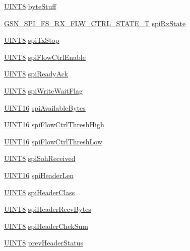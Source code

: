 \begin{DoxyCompactItemize}
\item 
\hyperlink{a00660_gab27e9918b538ce9d8ca692479b375b6a}{UINT8} \hyperlink{a00232_a7607005ffbebdca79ab3c4d558d0e442}{byteStuff}
\item 
\hyperlink{a00589_a3798d6bdf090c54eb4ca194e03183f1a}{GSN\_\-SPI\_\-FS\_\-RX\_\-FLW\_\-CTRL\_\-STATE\_\-T} \hyperlink{a00232_adf3468dddde12d5649c0b3225e1b0eb0}{spiRxState}
\item 
\hyperlink{a00660_gab27e9918b538ce9d8ca692479b375b6a}{UINT8} \hyperlink{a00232_aace49dfcb18e1db5bc4739a89ecc1ba3}{spiTxStop}
\item 
\hyperlink{a00660_gab27e9918b538ce9d8ca692479b375b6a}{UINT8} \hyperlink{a00232_a1bc4a98bab8dbbd5b534535948c82885}{spiFlowCtrlEnable}
\item 
\hyperlink{a00660_gab27e9918b538ce9d8ca692479b375b6a}{UINT8} \hyperlink{a00232_a7d64b559bc60710f2a2399d32349f735}{spiReadyAck}
\item 
\hyperlink{a00660_gab27e9918b538ce9d8ca692479b375b6a}{UINT8} \hyperlink{a00232_aece15d1c03fade6b2bb0c58ae4d868c1}{spiWriteWaitFlag}
\item 
\hyperlink{a00660_ga09f1a1fb2293e33483cc8d44aefb1eb1}{UINT16} \hyperlink{a00232_aeb856d40bd458a2626a852d943ac6011}{spiAvailableBytes}
\item 
\hyperlink{a00660_ga09f1a1fb2293e33483cc8d44aefb1eb1}{UINT16} \hyperlink{a00232_a7a439375ec71a8ebe796fcf8730e7b25}{spiFlowCtrlThreshHigh}
\item 
\hyperlink{a00660_ga09f1a1fb2293e33483cc8d44aefb1eb1}{UINT16} \hyperlink{a00232_ab3786a410bf7727e7b2a8fc665b8166e}{spiFlowCtrlThreshLow}
\item 
\hyperlink{a00660_gab27e9918b538ce9d8ca692479b375b6a}{UINT8} \hyperlink{a00232_a270e63329b400ca8c48bbbd00754c318}{spiSohReceived}
\item 
\hyperlink{a00660_ga09f1a1fb2293e33483cc8d44aefb1eb1}{UINT16} \hyperlink{a00232_a2be961edbf2f867b1faaae8ccf93fff7}{spiHeaderLen}
\item 
\hyperlink{a00660_gab27e9918b538ce9d8ca692479b375b6a}{UINT8} \hyperlink{a00232_a6bad1290acd8cb67171097a170be56cb}{spiHeaderClass}
\item 
\hyperlink{a00660_gab27e9918b538ce9d8ca692479b375b6a}{UINT8} \hyperlink{a00232_afcdc62251ccc6fbaa5c6e7a8e1fdc69c}{spiHeaderRecvBytes}
\item 
\hyperlink{a00660_gab27e9918b538ce9d8ca692479b375b6a}{UINT8} \hyperlink{a00232_af37c0fbe674b5a193736b7bc1f65b6fe}{spiHeaderChekSum}
\item 
\hyperlink{a00660_gab27e9918b538ce9d8ca692479b375b6a}{UINT8} \hyperlink{a00232_ab326bd4b1bbe3f68147d5136e2bf70ed}{prevHeaderStatus}

\end{DoxyCompactItemize}
